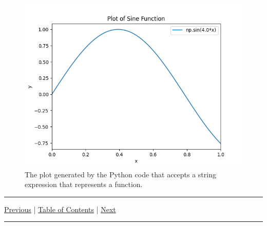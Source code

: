 \documentclass[10pt,fleqn]{article}
\begin{document}
\begin{figure}[h]
\centering
\includegraphics[width=6.0in]{../images/2ddataplot_05.png}
\vskip0.1in
\caption{The plot generated by the Python code that accepts a string expression
         that represents a function.}
\end{figure}
\eject
\vskip0.1in\hrule\vskip0.1in \noindent
  \href{../../topic_10/md/topic_10.md}{Previous} |
  \href{../../toc/md/topic_toc.md}{Table of Contents} |
  \href{../../topic_12/md/topic_12.md}{Next}
\vskip0.1in\hrule\vskip0.1in \noindent
\end{document}
